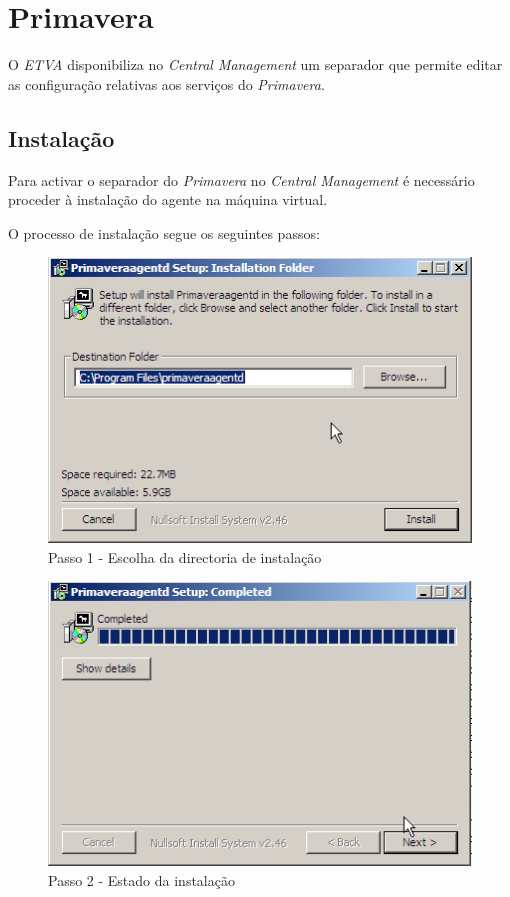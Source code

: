 \section{Primavera}

O \textit{ETVA} disponibiliza no \textit{Central Management} um separador que permite editar as configuração relativas aos serviços do \textit{Primavera}.

\subsection{Instalação}

Para activar o separador do \textit{Primavera} no \textit{Central Management} é necessário proceder à instalação do agente na máquina virtual.

O processo de instalação segue os seguintes passos:

\begin{figure}[H]
    \begin{center}
    \includegraphics[scale=0.38]{screenshots/primavera/primaverainstall_01.png}
    \caption{Passo 1 - Escolha da directoria de instalação}
    \label{fig:primavera_install_passo1}
    \end{center}
\end{figure}

\begin{figure}[H]
    \begin{center}
    \includegraphics[scale=0.38]{screenshots/primavera/primaverainstall_02.png}
    \caption{Passo 2 - Estado da instalação}
    \label{fig:primavera_install_passo2}
    \end{center}
\end{figure}

